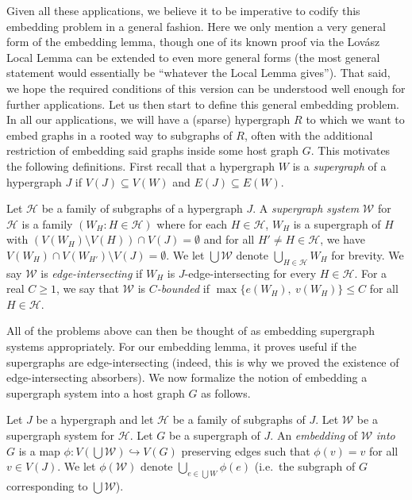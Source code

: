 \documentclass[twoside,leqno]{article}
\begin{document}
Given all these applications, we believe it to be imperative to codify this embedding problem in a general fashion. Here we only mention a very general form of the embedding lemma, though one of its known proof via the Lov\'asz Local Lemma can be extended to even more general forms (the most general statement would essentially be ``whatever the Local Lemma gives''). That said, we hope the required conditions of this version can be understood well enough for further applications.  
Let us then start to define this general embedding problem. In all our applications, we will have a (sparse) hypergraph $R$ to which we want to embed graphs in a rooted way to subgraphs of $R$, often with the additional restriction of embedding said graphs inside some host graph $G$. This motivates the following definitions. First recall that a hypergraph $W$ is a \emph{supergraph} of a hypergraph $J$ if $V(J)\subseteq V(W)$ and $E(J)\subseteq E(W)$.

\begin{definition}
Let $\mathcal{H}$ be a family of subgraphs of a hypergraph $J$. A \emph{supergraph system} $\mathcal{W}$ for $\mathcal{H}$ is a family $(W_H : H\in \mathcal{H})$ where for each $H\in \mathcal{H}$, $W_H$ is a supergraph of $H$ with $(V(W_H)\setminus V(H))\cap V(J)=\emptyset$ and for all $H'\ne H\in \mathcal{H}$, we have $V(W_H)\cap V(W_{H'}) \setminus V(J)= \emptyset$. We let $\bigcup \mathcal{W}$ denote $\bigcup_{H\in \mathcal{H}} W_H$ for brevity. We say $\mathcal{W}$ is \emph{edge-intersecting} if $W_H$ is $J$-edge-intersecting for every $H\in \mathcal{H}$. For a real $C \geq 1$, we say that $\mathcal{W}$ is \emph{$C$-bounded} if $\max\{e(W_H),~v(W_H)\}\le C$ for all $H\in \mathcal{H}$. 
\end{definition}

All of the problems above can then be thought of as embedding supergraph systems appropriately. For our embedding lemma, it proves useful if the supergraphs are edge-intersecting (indeed, this is why we proved the existence of edge-intersecting absorbers). We now formalize the notion of embedding a supergraph system into a host graph $G$ as follows.

\begin{definition}
Let $J$ be a hypergraph and let $\mathcal{H}$ be a family of subgraphs of $J$. Let $\mathcal{W}$ be a supergraph system for $\mathcal{H}$. Let $G$ be a supergraph of $J$. An \emph{embedding} of $\mathcal{W}$ \emph{into} $G$ is a map $\phi : V(\bigcup \mathcal{W}) \hookrightarrow V(G)$ preserving edges such that $\phi(v)=v$ for all $v\in V(J)$. We let $\phi(\mathcal{W})$ denote $\bigcup_{e\in \bigcup W} \phi(e)$ (i.e.~the subgraph of $G$ corresponding to $\bigcup \mathcal{W}$).
\end{definition}
\end{document}
